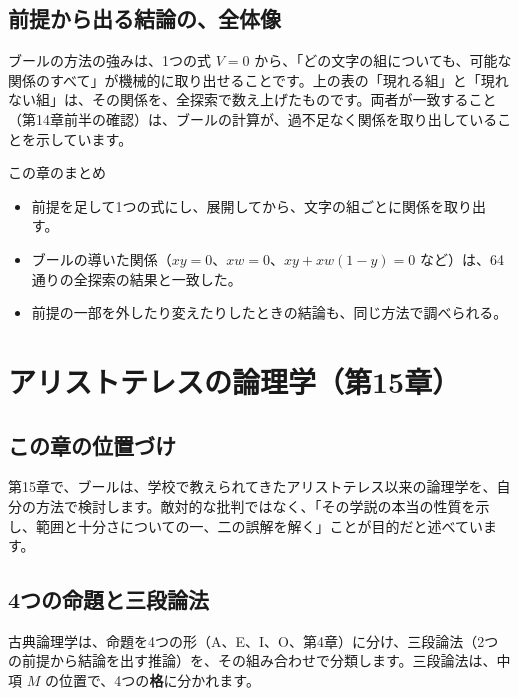 \documentclass[a4paper,11pt,openany]{ltjsbook}
\begin{document}
\section{前提から出る結論の、全体像}

ブールの方法の強みは、1つの式 $V=0$ から、「どの文字の組についても、可能な関係のすべて」が機械的に取り出せることです。上の表の「現れる組」と「現れない組」は、その関係を、全探索で数え上げたものです。両者が一致すること（第14章前半の確認）は、ブールの計算が、過不足なく関係を取り出していることを示しています。

\begin{pointbox}{この章のまとめ}
\begin{itemize}[leftmargin=*]
\item 前提を足して1つの式にし、展開してから、文字の組ごとに関係を取り出す。
\item ブールの導いた関係（$xy=0$、$xw=0$、$xy+xw(1-y)=0$ など）は、64通りの全探索の結果と一致した。
\item 前提の一部を外したり変えたりしたときの結論も、同じ方法で調べられる。
\end{itemize}
\end{pointbox}

\chapter{アリストテレスの論理学（第15章）}

\section{この章の位置づけ}

第15章で、ブールは、学校で教えられてきたアリストテレス以来の論理学を、自分の方法で検討します。敵対的な批判ではなく、「その学説の本当の性質を示し、範囲と十分さについての一、二の誤解を解く」ことが目的だと述べています。

\section{4つの命題と三段論法}

古典論理学は、命題を4つの形（A、E、I、O、第4章）に分け、三段論法（2つの前提から結論を出す推論）を、その組み合わせで分類します。三段論法は、中項 $M$ の位置で、4つの\textbf{格}に分かれます。
\end{document}
